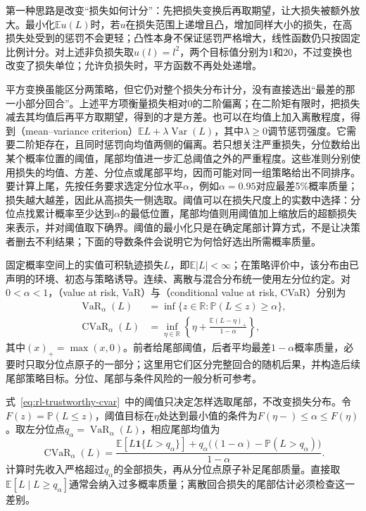 第一种思路是改变“损失如何计分”：先把损失变换后再取期望，让大损失被额外放大。最小化$\mathbb E u(L)$时，若$u$在损失范围上递增且凸，增加同样大小的损失，在高损失处受到的惩罚不会更轻；凸性本身不保证惩罚严格增大，线性函数仍只按固定比例计分。对上述非负损失取$u(l)=l^2$，两个目标值分别为1和20，不过变换也改变了损失单位；允许负损失时，平方函数不再处处递增。

平方变换虽能区分两策略，但它仍对整个损失分布计分，没有直接选出“最差的那一小部分回合”。上述平方项衡量损失相对0的二阶偏离；在二阶矩有限时，把损失减去其均值后再平方取期望，得到的才是方差。也可以在均值上加入离散程度，得到（mean--variance criterion）$\mathbb E L+\lambda\operatorname{Var}(L)$，其中$\lambda\geq0$调节惩罚强度。它需要二阶矩存在，且同时惩罚向均值两侧的偏离。若只想关注严重损失，分位数给出某个概率位置的阈值，尾部均值进一步汇总阈值之外的严重程度。这些准则分别使用损失的均值、方差、分位点或尾部平均，因而可能对同一组策略给出不同排序。要计算上尾，先按任务要求选定分位水平$\alpha$，例如$\alpha=0.95$对应最差5\%概率质量；损失越大越差，因此从高损失一侧选取。阈值可以在损失尺度上的实数中选择：分位点找累计概率至少达到$\alpha$的最低位置，尾部均值则用阈值加上缩放后的超额损失来表示，并对阈值取下确界。阈值的最小化只是在确定尾部计算方式，不是让决策者删去不利结果；下面的导数条件会说明它为何恰好选出所需概率质量。

固定概率空间上的实值可积轨迹损失$L$，即$\mathbb E|L|<\infty$；在策略评价中，该分布由已声明的环境、初态与策略诱导。连续、离散与混合分布统一使用左分位约定。对$0<\alpha<1$，（value at risk, VaR）与（conditional value at risk, CVaR）分别为
\begin{align}
 \operatorname{VaR}_\alpha(L)
 &=\inf\{z\in\mathbb R:\mathbb P(L\leq z)\geq\alpha\},\\
 \operatorname{CVaR}_\alpha(L)
 &=\inf_{\eta\in\mathbb R}\left\{\eta+\frac{\mathbb E(L-\eta)_+}{1-\alpha}\right\},
 \label{eq:rl-trustworthy-cvar}
\end{align}
其中$(x)_+=\max(x,0)$。前者给尾部阈值，后者平均最差$1-\alpha$概率质量，必要时只取分位点原子的一部分；这里用它们区分完整回合的随机后果，并构造后续尾部策略目标。分位、尾部与条件风险的一般分析可参考。

式~\eqref{eq:rl-trustworthy-cvar}~中的阈值只决定怎样选取尾部，不改变损失分布。令$F(z)=\mathbb P(L\leq z)$，阈值目标在$\eta$处达到最小值的条件为$F(\eta-)\leq\alpha\leq F(\eta)$。取左分位点$q_\alpha=\operatorname{VaR}_\alpha(L)$，相应尾部均值为
\begin{equation}
 \operatorname{CVaR}_\alpha(L)
 =\frac{\mathbb E[L\mathbf1\{L>q_\alpha\}]
       +q_\alpha\bigl((1-\alpha)-\mathbb P(L>q_\alpha)\bigr)}{1-\alpha}.
 \label{eq:rl-trustworthy-tail-mass}
\end{equation}
计算时先收入严格超过$q_\alpha$的全部损失，再从分位点原子补足尾部质量。直接取$\mathbb E[L\mid L\geq q_\alpha]$通常会纳入过多概率质量；离散回合损失的尾部估计必须检查这一差别。

